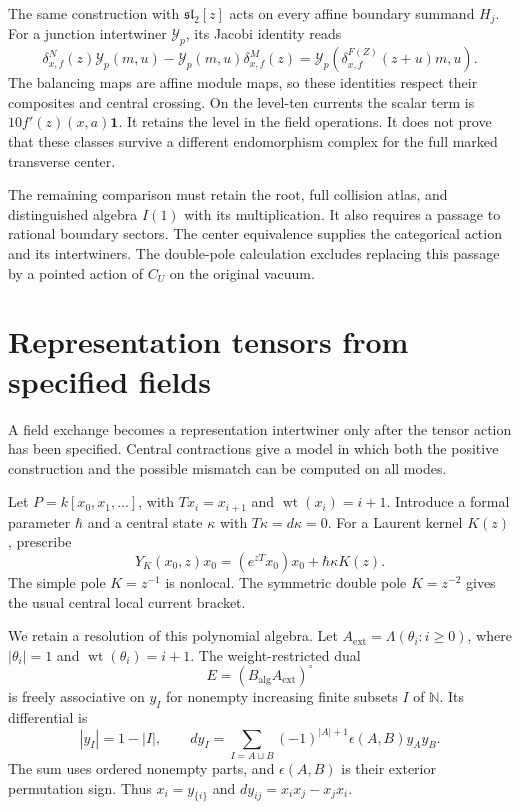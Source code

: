The same construction with $\mathfrak{sl}_2[z]$ acts on
every affine boundary summand $H_j$.
For a junction intertwiner $\mathcal Y_p$, its Jacobi
identity reads
\[
 \delta_{x,f}^{N}(z)\mathcal Y_p(m,u)
 -\mathcal Y_p(m,u)\delta_{x,f}^{M}(z)
 =
 \mathcal Y_p(\delta_{x,f}^{F(Z)}(z+u)m,u).
\]
The balancing maps are affine module maps, so these
identities respect their composites and central crossing.
On the level-ten currents the scalar term is
$10f'(z)(x,a)\mathbf1$.
It retains the level in the field operations.
It does not prove that these classes survive a different
endomorphism complex for the full marked transverse center.

The remaining comparison must retain the root, full collision
atlas, and distinguished algebra $I(1)$ with its multiplication.
It also requires a passage to rational boundary sectors. The center equivalence supplies the
categorical action and its intertwiners.
The double-pole calculation excludes replacing this
passage by a pointed action of $C_U$ on the original vacuum.

\section{Representation tensors from specified fields}
\label{v4-arith:centers:sec:representation-tensors}

A field exchange becomes a representation intertwiner only
after the tensor action has been specified. Central contractions
give a model in which both the positive construction and the
possible mismatch can be computed on all modes.

Let $P=k[x_0,x_1,\ldots]$, with $Tx_i=x_{i+1}$ and
$\operatorname{wt}(x_i)=i+1$. Introduce a formal parameter
$\hbar$ and a central state $\kappa$ with
$T\kappa=d\kappa=0$. For a Laurent kernel $K(z)$, prescribe
\[
 Y_K(x_0,z)x_0=(e^{zT}x_0)x_0+\hbar\kappa K(z).
\]
The simple pole $K=z^{-1}$ is nonlocal. The symmetric
double pole $K=z^{-2}$ gives the usual central local
current bracket.

We retain a resolution of this polynomial algebra.
Let $A_{\mathrm{ext}}=\Lambda(\theta_i:i\geq0)$, where
$|\theta_i|=1$ and $\operatorname{wt}(\theta_i)=i+1$.
The weight-restricted dual
\[
 E=(B_{\mathrm{alg}}A_{\mathrm{ext}})^\circ
\]
is freely associative on $y_I$ for nonempty increasing
finite subsets $I$ of $\mathbb N$. Its differential is
\[
 |y_I|=1-|I|,\qquad
 dy_I=\sum_{I=A\sqcup B}
 (-1)^{|A|+1}\epsilon(A,B)y_Ay_B.
\]
The sum uses ordered nonempty parts, and $\epsilon(A,B)$
is their exterior permutation sign.
Thus $x_i=y_{\{i\}}$ and $dy_{ij}=x_ix_j-x_jx_i$.

